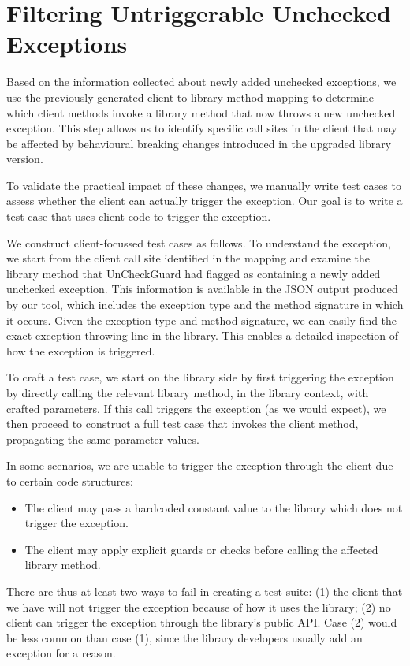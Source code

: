 \section{Filtering Untriggerable Unchecked Exceptions}

Based on the information collected about newly added unchecked exceptions, we use the previously generated client-to-library method mapping to determine which client methods invoke a library method that now throws a new unchecked exception. This step allows us to identify specific call sites in the client that may be affected by behavioural breaking changes introduced in the upgraded library version.

To validate the practical impact of these changes, we manually write test cases to assess whether the client can actually trigger the exception. Our goal is to write a test case that uses client code to trigger the exception.

We construct client-focussed test cases as follows. To understand the exception, we start from the client call site identified in the mapping and examine the library method that UnCheckGuard had flagged as containing a newly added unchecked exception. This information is available in the JSON output produced by our tool, which includes the exception type and the method signature in which it occurs. Given the exception type and method signature, we can easily find the exact exception-throwing line in the library. This enables a detailed inspection of how the exception is triggered.

To craft a test case, we start on the library side by first triggering the exception by directly calling the relevant library method, in the library context, with crafted parameters. If this call triggers the exception (as we would expect), we then proceed to construct a full test case that invokes the client method, propagating the same parameter values.

In some scenarios, we are unable to trigger the exception through the client due to certain code structures:
\begin{itemize}
  \item The client may pass a hardcoded constant value to the library which does not trigger the exception.
  \item The client may apply explicit guards or checks before calling the affected library method.
\end{itemize}
There are thus at least two ways to fail in creating a test suite: (1) the client that we have will not trigger the exception because of how it uses the library; (2) no client can trigger the exception through the library's public API. Case (2) would be less common than case (1), since the library developers usually add an exception for a reason.

